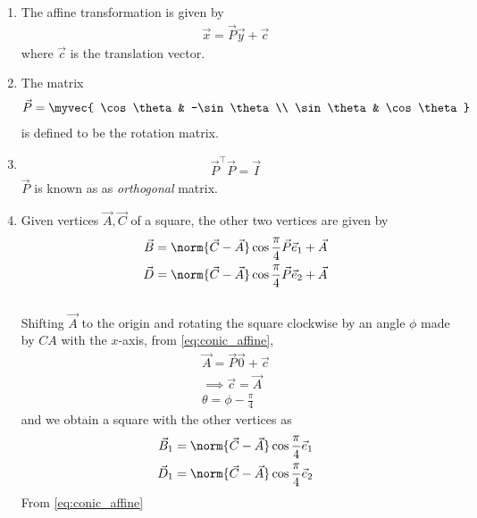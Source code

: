 \begin{enumerate}[label=\thesubsection.\arabic*.,ref=\thesubsection.\theenumi]
	\item 
The affine transformation is given by 
\begin{align}
	\label{eq:conic_affine}
	\vec{x} = \vec{P}\vec{y}+\vec{c}
\end{align}
where $\vec{c}$ is the translation vector.
\item The matrix
\begin{align}
\vec{P} =
\myvec{
\cos\theta & -\sin\theta \\
\sin\theta & \cos\theta 
}
\end{align}
is defined to be the rotation matrix. 
\item 
\begin{align}
	\vec{P}^{\top} \vec{P} = \vec{I}
\end{align}
		$\vec{P}$ is known as as {\em orthogonal} matrix.
\item Given vertices $\vec{A}, \vec{C}$ of a square, the other two vertices are given by
\begin{align}
\begin{split}
	\vec{B} = \norm{\vec{C}-\vec{A}}\cos \frac{\pi}{4}\vec{P}\vec{e}_1+\vec{A}
	\\
	\vec{D} = \norm{\vec{C}-\vec{A}}\cos \frac{\pi}{4}\vec{P}\vec{e}_2+\vec{A}
\end{split}
	\label{eq:affine-square-bd}
\end{align}
	\\
		\solution Shifting $\vec{A}$ to the origin and rotating the square clockwise by an angle $\phi$ made by $CA$ with the $x$-axis,
	from \eqref{eq:conic_affine},
\begin{align}
\vec{A} = \vec{P}\vec{0}+\vec{c}
\\
\implies 
\vec{c} = \vec{A}
\\
	\theta =  \phi -\frac{\pi}{4} 
\end{align}
and we obtain a square with the other vertices as
\begin{align}
\begin{split}
	\vec{B}_1 = \norm{\vec{C}-\vec{A}}\cos \frac{\pi}{4}\vec{e}_1
	\\
	\vec{D}_1 = \norm{\vec{C}-\vec{A}}\cos \frac{\pi}{4}\vec{e}_2
\end{split}
	\label{eq:affine-bd}
\end{align}
	From \eqref{eq:conic_affine}

\end{enumerate}
